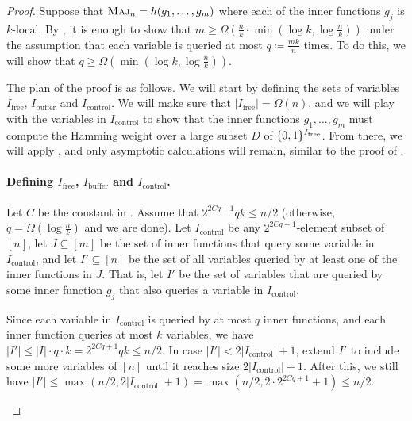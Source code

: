 \documentclass[10pt,a4paper]{article}
\theoremstyle{definition}
\theoremstyle{remark}
\newcommand{\mathsc}[1]{{\normalfont\textsc{#1}}}
\DeclarePairedDelimiter{\set}{\{}{\}}
\DeclareMathOperator{\Maj}{\mathsc{Maj}}
\newcommand{\zo}{\set{0,1}}
\newcommand{\Ifree}{I_{\mathrm{free}}}
\newcommand{\Icontrol}{I_{\mathrm{control}}}
\newcommand{\Ibuffer}{I_{\mathrm{buffer}}}
\begin{document}
\begin{proof}
Suppose that $\Maj_n = h(g_1, \ldots, g_m)$ where each of the inner functions $g_j$ is $k$-local.
By , it is enough to show that $m \geq \Omega(\frac{n}{k} \cdot \min(\log k, \log \frac{n}{k}))$ under the assumption that each variable is queried at most $q \coloneqq \frac{mk}{n}$ times.
To do this, we will show that $q \geq \Omega(\min(\log k, \log \frac{n}{k}))$.

The plan of the proof is as follows.
We will start by defining the sets of variables $\Ifree$, $\Ibuffer$ and $\Icontrol$.
We will make sure that $|\Ifree| = \Omega(n)$, and we will play with the variables in $\Icontrol$ to show that the inner functions $g_1, \ldots, g_m$ must compute the Hamming weight over a large subset $D$ of $\zo^{\Ifree}$.
From there, we will apply , and only asymptotic calculations will remain, similar to the proof of .

\paragraph*{Defining $\Ifree$, $\Ibuffer$ and $\Icontrol$.}
Let $C$ be the constant in .
Assume that $2^{2Cq+1} qk \leq n/2$ (otherwise, $q = \Omega(\log \frac{n}{k})$ and we are done).
Let $\Icontrol$ be any $2^{2Cq+1}$-element subset of $[n]$, let $J \subseteq [m]$ be the set of inner functions that query some variable in $\Icontrol$, and let $I'\subseteq [n]$ be the set of all variables queried by at least one of the inner functions in $J$.
That is, let $I'$ be the set of variables that are queried by some inner function $g_j$ that also queries a variable in $\Icontrol$.

Since each variable in $\Icontrol$ is queried by at most $q$ inner functions, and each inner function queries at most $k$ variables, we have $|I'| \leq |I| \cdot q \cdot k = 2^{2Cq+1} qk \leq n/2$.
In case $|I'| < 2|\Icontrol|+1$, extend $I'$ to include some more variables of $[n]$ until it reaches size $2|\Icontrol|+1$.
After this, we still have $|I'| \leq \max(n/2, 2|\Icontrol|+1) = \max(n/2, 2\cdot 2^{2Cq+1}+1) \leq n/2$.

\begin{figure}[h]
\centering 

\end{figure}
\end{proof}
\end{document}
